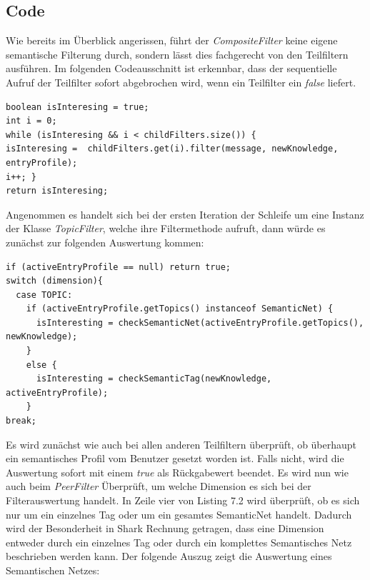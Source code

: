 \subsection{Code}
Wie bereits im Überblick angerissen, führt der \textit{CompositeFilter} keine eigene semantische Filterung durch, sondern lässt dies fachgerecht von den Teilfiltern ausführen. Im folgenden Codeausschnitt ist erkennbar, dass der sequentielle Aufruf der Teilfilter sofort abgebrochen wird, wenn ein Teilfilter ein \textit{false} liefert.
\lstset{language=Java, caption=Filtermethode im Kompositum, label=DescriptiveLabel, numbers=left, numbersep=1em, breaklines=true, basicstyle=\small}
\begin{lstlisting}
boolean isInteresing = true;
int i = 0;
while (isInteresing && i < childFilters.size()) {
isInteresing =  childFilters.get(i).filter(message, newKnowledge, entryProfile);
i++; }
return isInteresing;
\end{lstlisting}
Angenommen es handelt sich bei der ersten Iteration der Schleife um eine Instanz der Klasse \textit{TopicFilter}, welche ihre Filtermethode aufruft, dann würde es zunächst zur folgenden Auswertung kommen:
\lstset{language=Java, caption=Filtermethode des TopicType Filters (Auszug), label=DescriptiveLabel, numbers=left, numbersep=1em, breaklines=true, basicstyle=\small}
\begin{lstlisting}
if (activeEntryProfile == null) return true;
switch (dimension){
  case TOPIC:
    if (activeEntryProfile.getTopics() instanceof SemanticNet) {
	  isInteresting = checkSemanticNet(activeEntryProfile.getTopics(), newKnowledge);
	}
	else {
	  isInteresting = checkSemanticTag(newKnowledge, activeEntryProfile);
    }
break;
\end{lstlisting}
Es wird zunächst wie auch bei allen anderen Teilfiltern überprüft, ob überhaupt ein semantisches Profil vom Benutzer gesetzt worden ist. Falls nicht, wird die Auswertung sofort mit einem \textit{true} als Rückgabewert beendet. Es wird nun wie auch beim \textit{PeerFilter} Überprüft, um welche Dimension es sich bei der Filterauswertung handelt. In Zeile vier von Listing 7.2 wird überprüft, ob es sich nur um ein einzelnes Tag oder um ein gesamtes SemanticNet handelt. Dadurch wird der Besonderheit in Shark Rechnung getragen, dass eine Dimension entweder durch ein einzelnes Tag oder durch ein komplettes Semantisches Netz beschrieben werden kann. Der folgende Auszug zeigt die Auswertung eines Semantischen Netzes:
\lstset{language=Java, caption=Auswertung des Semantischen Netzes (Auszug), label=DescriptiveLabel, numbers=left, numbersep=1em, breaklines=true, basicstyle=\small}
